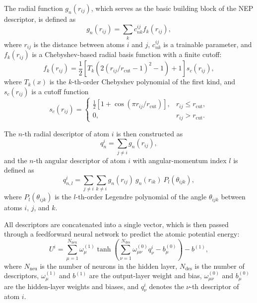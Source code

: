 \documentclass[%
reprint,
superscriptaddress,
 amsmath,amssymb,
 aps,
]{revtex4-2}
\begin{document}
The radial function $g_n(r_{ij})$, which serves as the basic building block of the NEP
descriptor, is defined as
\begin{equation}
g_n(r_{ij}) = \sum_{k} c^{ij}_{nk} f_k(r_{ij}),
\end{equation}
where $r_{ij}$ is the distance between atoms $i$ and $j$, 
$c^{ij}_{nk}$ is a trainable parameter, and $f_k(r_{ij})$ is a Chebyshev-based
radial basis function with a finite cutoff:
\begin{equation}
f_k(r_{ij}) = \frac{1}{2}\!\left[T_k\!\!\left(2(r_{ij}/r_{\mathrm{cut}} - 1)^2 - 1\right)+1\right] s_c(r_{ij}),
\end{equation}
where $T_k(x)$ is the $k$-th-order Chebyshev polynomial of the first kind, and 
$s_c(r_{ij})$ is a cutoff function
\begin{equation}
s_c(r_{ij}) =
\begin{cases}
  \frac{1}{2}\!\left[1+\cos(\pi r_{ij}/r_{\mathrm{cut}})\right], & r_{ij} \le r_{\mathrm{cut}}, \\
  0, & r_{ij} > r_{\mathrm{cut}}.
\end{cases}
\end{equation}

The $n$-th radial descriptor of atom $i$ is then constructed as
\begin{equation}
q_n^i = \sum_{j \ne i} g_n(r_{ij}),
\end{equation}
and the $n$-th angular descriptor of atom $i$ with angular-momentum index $l$
is defined as
\begin{equation}
q_{n,l}^i = \sum_{j \ne i}\sum_{k \ne i} g_n(r_{ij})~g_n(r_{ik})~P_l(\theta_{ijk}),
\end{equation}
where $P_l(\theta_{ijk})$ is the $l$-th-order Legendre polynomial of the angle
$\theta_{ijk}$ between atoms $i$, $j$, and $k$.

All descriptors are concatenated into a single vector, which is then passed
through a feedforward neural network to predict the atomic potential energy:
\begin{equation}
U^i =
\sum_{\mu=1}^{N_{\mathrm{neu}}}
\omega^{(1)}_\mu
\tanh\!\left(
\sum_{\nu=1}^{N_{\mathrm{des}}}
\omega^{(0)}_{\mu\nu} q^i_\nu - b^{(0)}_\mu
\right)
- b^{(1)},
\end{equation}
where $N_{\mathrm{neu}}$ is the number of neurons in the hidden layer,
$N_{\mathrm{des}}$ is the number of descriptors,
$\omega^{(1)}_\mu$ and $b^{(1)}$ are the output-layer weight and bias,
$\omega^{(0)}_{\mu\nu}$ and $b^{(0)}_\mu$ are the hidden-layer weights and biases,
and $q^i_\nu$ denotes the $\nu$-th descriptor of atom $i$.
\end{document}

